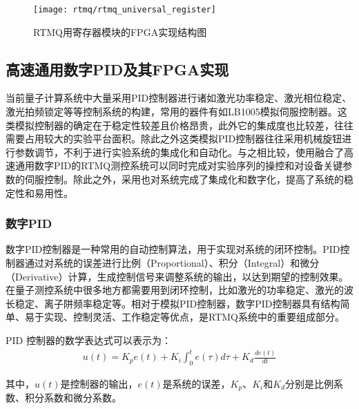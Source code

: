 \begin{figure}
    \centering
    \caption[RTMQ用寄存器模块的FPGA实现结构图]{RTMQ用寄存器模块的FPGA实现结构图\label{fig:rtmq_universal_register}}
    \texttt{[image: rtmq/rtmq\_universal\_register]}
\end{figure}





\subsection[高速通用数字PID及其FPGA实现]{高速通用数字PID及其FPGA实现\label{section:digital_pid}}
当前量子计算系统中大量采用PID控制器进行诸如激光功率稳定、激光相位稳定、激光拍频锁定等等控制系统的构建，常用的器件有如LB1005模拟伺服控制器。这类模拟控制器的确定在于稳定性较差且价格昂贵，此外它的集成度也比较差，往往需要占用较大的实验平台面积。除此之外这类模拟PID控制器往往采用机械旋钮进行参数调节，不利于进行实验系统的集成化和自动化。与之相比较，使用融合了高速通用数字PID的RTMQ测控系统可以同时完成对实验序列的操控和对设备关键参数的伺服控制。除此之外，采用也对系统完成了集成化和数字化，提高了系统的稳定性和易用性。

\subsubsection[数字PID]{数字PID}
数字PID控制器是一种常用的自动控制算法，用于实现对系统的闭环控制。PID控制器通过对系统的误差进行比例（Proportional）、积分（Integral）和微分（Derivative）计算，生成控制信号来调整系统的输出，以达到期望的控制效果。在量子测控系统中很多地方都需要用到闭环控制，比如激光的功率稳定、激光的波长稳定、离子阱频率稳定等。相对于模拟PID控制器，数字PID控制器具有结构简单、易于实现、控制灵活、工作稳定等优点，是RTMQ系统中的重要组成部分。

PID 控制器的数学表达式可以表示为：
\begin{align}
    u(t)= K_p e(t) + K_i \int_{0}^{t} e(\tau) d\tau + K_d \frac{d e(t)}{dt}
\end{align}

其中，$u(t)$是控制器的输出，$e(t)$是系统的误差，$K_p$、$K_i$和$K_d$分别是比例系数、积分系数和微分系数。
 
